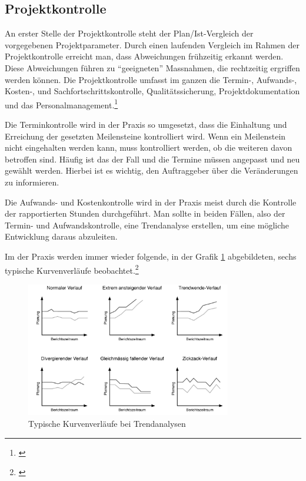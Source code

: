 
\subsection{Projektkontrolle}
An erster Stelle der Projektkontrolle steht der Plan/Ist-Vergleich der vorgegebenen
Projektparameter. Durch einen laufenden Vergleich im Rahmen der Projektkontrolle
erreicht man, dass Abweichungen frühzeitig erkannt werden. Diese Abweichungen
führen zu ``geeigneten'' Massnahmen, die rechtzeitig ergriffen werden können.
Die Projektkontrolle umfasst im ganzen die Termin-, Aufwands-, Kosten-, 
und Sachfortschrittskontrolle, Qualitätssicherung, Projektdokumentation und
das Personalmanagement.\footnote{\citealp*[Vgl.][S. 15]{burghardt2007einfuehrung}}

Die Terminkontrolle wird in der Praxis so umgesetzt, dass die Einhaltung
und Erreichung der gesetzten Meilensteine kontrolliert wird. Wenn ein 
Meilenstein nicht eingehalten werden kann, muss kontrolliert werden, ob die
weiteren davon betroffen sind. Häufig ist das der Fall und die Termine
müssen angepasst und neu gewählt werden. Hierbei ist es wichtig, den Auftraggeber
über die Veränderungen zu informieren.

Die Aufwands- und Kostenkontrolle wird in der Praxis meist durch die Kontrolle
der rapportierten Stunden durchgeführt. Man sollte in beiden Fällen, also der
Termin- und Aufwandskontrolle, eine Trendanalyse erstellen, um eine mögliche
Entwicklung daraus abzuleiten.

Im der Praxis werden immer wieder folgende, in der Grafik \ref{pic:06_trendanalyse}
abgebildeten, sechs typische Kurvenverläufe beobachtet.\footnote{\citealp*[Vgl.][S. 177 und S. 194]{burghardt2007einfuehrung}}

\begin{figure}[htbp]
\begin{center}
\includegraphics[width=0.8\textwidth,angle=0]{./bilder/theorie/06_trendanalyse.pdf}
\caption{Typische Kurvenverläufe bei Trendanalysen}
\label{pic:06_trendanalyse}
\end{center}
\end{figure}


